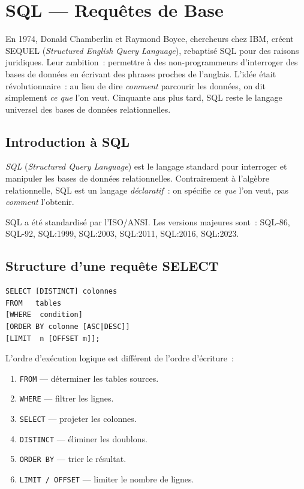 \chapter{SQL --- Requ\^etes de Base}
\label{ch:sql_base}

En 1974, Donald Chamberlin et Raymond Boyce, chercheurs chez IBM, cr\'eent SEQUEL (\emph{Structured English Query Language}), rebaptis\'e SQL pour des raisons juridiques. Leur ambition~: permettre \`a des non-programmeurs d'interroger des bases de donn\'ees en \'ecrivant des phrases proches de l'anglais. L'id\'ee \'etait r\'evolutionnaire~: au lieu de dire \emph{comment} parcourir les donn\'ees, on dit simplement \emph{ce que} l'on veut. Cinquante ans plus tard, SQL reste le langage universel des bases de donn\'ees relationnelles.

\section{Introduction \`a SQL}

\begin{definition}[SQL]
\emph{SQL} (\emph{Structured Query Language}) est le langage standard
pour interroger et manipuler les bases de donn\'ees relationnelles.
Contrairement \`a l'alg\`ebre relationnelle, SQL est un langage
\emph{d\'eclaratif}~: on sp\'ecifie \emph{ce que} l'on veut, pas \emph{comment}
l'obtenir.
\end{definition}

SQL a \'et\'e standardis\'e par l'ISO/ANSI. Les versions majeures sont~:
SQL-86, SQL-92, SQL:1999, SQL:2003, SQL:2011, SQL:2016, SQL:2023.

\section{Structure d'une requ\^ete SELECT}

\begin{formules}[title=\textbf{Syntaxe g\'en\'erale du SELECT}]
\begin{verbatim}
SELECT [DISTINCT] colonnes
FROM   tables
[WHERE  condition]
[ORDER BY colonne [ASC|DESC]]
[LIMIT  n [OFFSET m]];
\end{verbatim}
\end{formules}

L'ordre d'ex\'ecution logique est diff\'erent de l'ordre d'\'ecriture~:
\begin{enumerate}
    \item \texttt{FROM} --- d\'eterminer les tables sources.
    \item \texttt{WHERE} --- filtrer les lignes.
    \item \texttt{SELECT} --- projeter les colonnes.
    \item \texttt{DISTINCT} --- \'eliminer les doublons.
    \item \texttt{ORDER BY} --- trier le r\'esultat.
    \item \texttt{LIMIT / OFFSET} --- limiter le nombre de lignes.
\end{enumerate}

